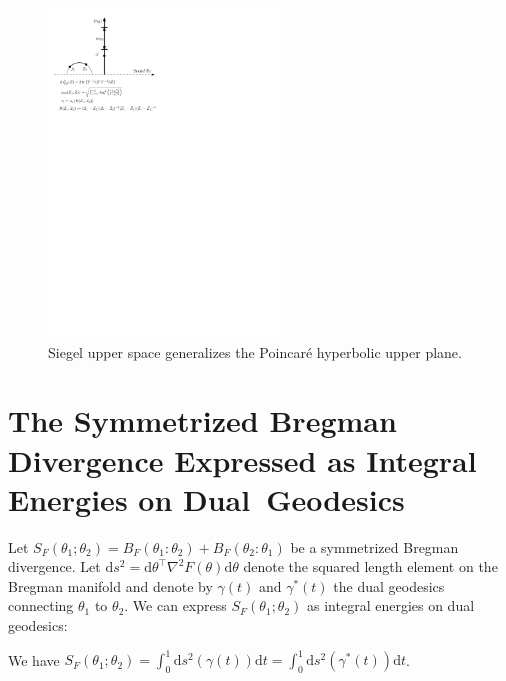 \documentclass[entropy,article,accept,oneauthor,pdftex,entropy]{Definitions/mdpi}
\def\dtheta{\mathrm{d}\theta}
\def\dt{\mathrm{d}t}
\def\ds{\mathrm{d}s}
\begin{document}
\begin{figure}[H]

\includegraphics[width=0.55\textwidth]{FigIpe-MVNSiegelUpperDisk.pdf}
%
\caption{Siegel upper space generalizes the Poincar\'e hyperbolic upper plane.
 \label{fig:SiegelDistance}}
\end{figure}
\unskip

 \section{The Symmetrized Bregman Divergence Expressed as Integral Energies on Dual~Geodesics}\label{sec:proof}

Let $S_F(\theta_1;\theta_2)=B_F(\theta_1:\theta_2)+B_F(\theta_2:\theta_1)$ be a symmetrized Bregman divergence.
Let $\ds^2=\dtheta^\top \nabla^2 F(\theta)\dtheta$ denote the squared length element on the Bregman manifold 
and denote by $\gamma(t)$ and $\gamma^*(t)$ the dual geodesics connecting $\theta_1$ to $\theta_2$.
We can express $S_F(\theta_1;\theta_2)$ as integral energies on dual geodesics:
\begin{Property}
We have $S_F(\theta_1;\theta_2)=\int_0^1 \ds^2(\gamma(t))\dt=\int_0^1 \ds^2(\gamma^*(t))\dt$.
\end{Property}
\end{document}
